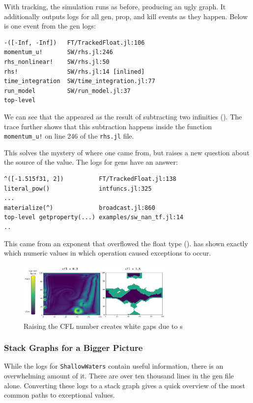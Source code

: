 \documentclass{juliacon}
\begin{document}
With tracking, the simulation runs as before, producing an ugly graph.
It additionally outputs logs for all gen, prop, and kill events
as they happen.
Below is one event from the gen logs:

\begin{lstlisting}
-([-Inf, -Inf])   FT/TrackedFloat.jl:106
momentum_u!       SW/rhs.jl:246
rhs_nonlinear!    SW/rhs.jl:50
rhs!              SW/rhs.jl:14 [inlined]
time_integration  SW/time_integration.jl:77
run_model         SW/run_model.jl:37
top-level
\end{lstlisting}

We can see that the \NaN{} appeared as the result of subtracting two infinities ().
The trace further shows that this subtraction happens inside the function \texttt{momentum\_u!} on line 246 of the \texttt{rhs.jl} file.

This solves the mystery of where one \NaN{} came from, but raises a new question
about the source of the \Inf{} value.
The logs for \Inf{} gens have an answer:

\begin{lstlisting}
^([-1.515f31, 2])          FT/TrackedFloat.jl:138
literal_pow()              intfuncs.jl:325
...
materialize(^)             broadcast.jl:860
top-level getproperty(...) examples/sw_nan_tf.jl:14
..
\end{lstlisting}
%
This \Inf{} came from an exponent that overflowed the float type ().
\FT{} has shown exactly which numeric values in which operation
caused exceptions to occur.

\begin{figure}[t]
  \centering
  \includegraphics[width=3in]{./fig/shallow_waters_cfl_diff.pdf}
  \caption{Raising the CFL number creates white gaps due to \NaN{}s}
  \label{fig:sw_nans}
\end{figure}


\subsubsection{Stack Graphs for a Bigger Picture}

While the logs for \texttt{ShallowWaters} contain useful information,
there is an overwhelming amount of it.
There are over ten thousand lines in the gen file alone.
Converting these logs to a stack graph gives a quick overview
of the most common paths to exceptional values.
\end{document}
